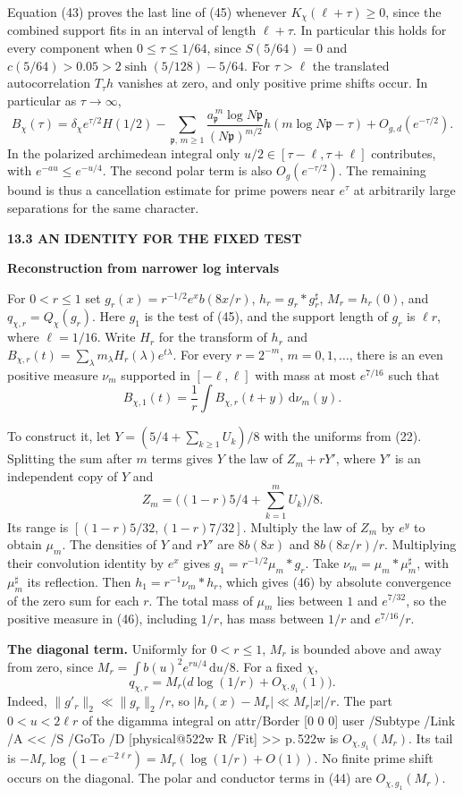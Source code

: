 \documentclass[11pt,letterpaper]{article}
\makeatletter
\newcommand{\rightmarktext}{}
\newcommand{\printfolio}{}
\newcommand{\leaf}[4]{\clearpage\gdef\printfolio{#1}\gdef\rightmarktext{#2}%
  {\small\sffamily\bfseries\color{ink}#3\par}\vspace{3pt}%
  {\LARGE\bfseries #4\par}\vspace{5pt}}
\newcommand{\point}[1]{\par\smallskip\textbf{#1.}\enspace\ignorespaces}
\newcommand{\dd}{\,\mathrm d}
\newcommand{\MusicPDFPageRef}[1]{\pdfpageref\csname physical@#1\endcsname\space\space 0 R}
\newcommand{\pagelink}[2]{\leavevmode\pdfstartlink attr{/Border [0 0 0]} user{%
  /Subtype /Link /A << /S /GoTo /D [\MusicPDFPageRef{#1} /Fit] >>}%
  {\color{ink}#2}\pdfendlink}
\newcommand{\pg}[1]{\pagelink{#1}{p.\,#1}}
\makeatother
\begin{document}
Equation (43) proves the last line of (45) whenever
$K_\chi(\ell+\tau)\ge0$, since the combined support fits in an
interval of length $\ell+\tau$. In particular this holds for every
component when $0\le\tau\le1/64$, since $S(5/64)=0$ and
$c(5/64)>0.05>2\sinh(5/128)-5/64$. For $\tau>\ell$ the translated
autocorrelation $T_\tau h$ vanishes at zero, and only positive prime
shifts occur. In particular as $\tau\to\infty$,
\[
 B_\chi(\tau)=\delta_\chi e^{\tau/2}H(1/2)
 -\sum_{\mathfrak p,\,m\ge1}
 \frac{a_{\mathfrak p}^{\,m}\log N\mathfrak p}{(N\mathfrak p)^{m/2}}
 h(m\log N\mathfrak p-\tau)+O_{g,d}(e^{-\tau/2}).
\]
In the polarized archimedean integral only $u/2\in[\tau-\ell,\tau+\ell]$
contributes, with $e^{-au}\le e^{-u/4}$. The second polar term is
also $O_g(e^{-\tau/2})$. The remaining bound is thus a cancellation
estimate for prime powers near $e^\tau$ at arbitrarily large separations
for the same character.

\leaf{522z}{Dilations of the test}{13.3 \quad AN IDENTITY FOR THE FIXED TEST}{Reconstruction from narrower log intervals}
For $0<r\le1$ set $g_r(x)=r^{-1/2}e^x b(8x/r)$,
$h_r=g_r*g_r^\sharp$, $M_r=h_r(0)$, and $q_{\chi,r}=Q_\chi(g_r)$.
Here $g_1$ is the test of (45), and the support length of $g_r$ is
$\ell r$, where $\ell=1/16$. Write $H_r$ for the transform of $h_r$ and
$B_{\chi,r}(t)=\sum_\lambda m_\lambda H_r(\lambda)e^{t\lambda}$.
For every $r=2^{-m}$, $m=0,1,\ldots$, there is an even positive measure
$\nu_m$ supported in $[-\ell,\ell]$ with mass at most $e^{7/16}$ such that
\[
 B_{\chi,1}(t)=\frac1r\int B_{\chi,r}(t+y)\dd\nu_m(y).
 \tag{46}
\]

To construct it, let $Y=(5/4+\sum_{k\ge1}U_k)/8$ with the uniforms
from (22). Splitting the sum after $m$ terms gives $Y$ the law of
$Z_m+rY'$, where $Y'$ is an independent copy of $Y$ and
\[
 Z_m=\big((1-r)5/4+\textstyle\sum_{k=1}^{m}U_k\big)/8 .
\]
Its range is $[(1-r)5/32,(1-r)7/32]$. Multiply the law of $Z_m$
by $e^y$ to obtain $\mu_m$. The densities of $Y$ and $rY'$ are
$8b(8x)$ and $8b(8x/r)/r$. Multiplying their convolution identity
by $e^x$ gives $g_1=r^{-1/2}\mu_m*g_r$.
Take $\nu_m=\mu_m*\mu_m^\sharp$, with $\mu_m^\sharp$ its reflection.
Then $h_1=r^{-1}\nu_m*h_r$, which gives (46) by absolute convergence
of the zero sum for each $r$. The total mass of $\mu_m$ lies between
$1$ and $e^{7/32}$, so the positive measure in (46), including $1/r$,
has mass between $1/r$ and $e^{7/16}/r$.

\point{The diagonal term} Uniformly for $0<r\le1$, $M_r$ is bounded
above and away from zero, since $M_r=\int b(u)^2e^{ru/4}\dd u/8$.
For a fixed $\chi$,
\[
 q_{\chi,r}=M_r\big(d\log(1/r)+O_{\chi,g_1}(1)\big).
\]
Indeed, $\|g'_r\|_2\ll\|g_r\|_2/r$, so
$|h_r(x)-M_r|\ll M_r |x|/r$. The part $0<u<2\ell r$ of the
digamma integral on \pg{522w} is $O_{\chi,g_1}(M_r)$. Its tail is
$-M_r\log(1-e^{-2\ell r})=M_r(\log(1/r)+O(1))$.
No finite prime shift occurs on the diagonal. The polar and conductor
terms in (44) are $O_{\chi,g_1}(M_r)$.
\end{document}
